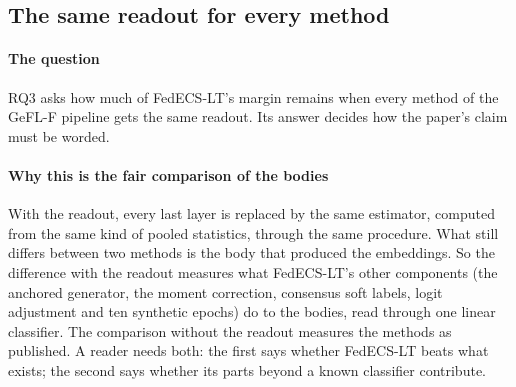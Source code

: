 \subsection{The same readout for every method}\label{sec:s-same-readout}

\paragraph{The question} RQ3 asks how much of FedECS-LT's margin remains when every method of the GeFL-F pipeline gets
the same readout. Its answer decides how the paper's claim must be worded.

\paragraph{Why this is the fair comparison of the bodies} With the readout, every last layer is replaced by the same
estimator, computed from the same kind of pooled statistics, through the same procedure. What still differs between two
methods is the body that produced the embeddings. So the difference with the readout measures what FedECS-LT's
other components (the anchored generator, the moment correction, consensus soft labels, logit adjustment and ten
synthetic epochs) do to the bodies, read through one linear classifier. The comparison without the readout measures
the methods as published. A reader needs both: the first says whether FedECS-LT beats what exists; the second says
whether its parts beyond a known classifier contribute.

\begin{table}[t]
\centering\small
\caption{Balanced accuracy (\%) with every last layer set by the exact readout, the paper's readout table. Methods of
the GeFL-F pipeline only. Compare each row with its value in \cref{tab:s-main}: the readout raises every method.}
\label{tab:s-er}
\end{table}

\begin{table}[t]
\centering\small
\caption{FedECS-LT minus each method, both with the readout (points), paired over seeds 3--5, with the 95\% $t$
interval; bold: significant after Holm's correction. From the paper's appendix. Look at whether the intervals contain
zero.}
\label{tab:s-er-paired}
\end{table}

